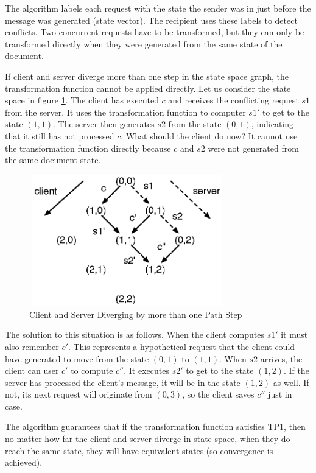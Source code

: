 The algorithm labels each request with the state the sender was in just before the message was generated (state vector). The recipient uses these labels to detect conflicts. Two concurrent requests have to be transformed, but they can only be transformed directly when they were generated from the same state of the document.

If client and server diverge more than one step in the state space graph, the transformation function cannot be applied directly. Let us consider the state space in figure \ref{fig:concepts.statespace2}. The client has executed $c$ and receives the conflicting request $s1$ from the server. It uses the transformation function to computer $s1'$ to get to the state $(1,1)$. The server then generates $s2$ from the state $(0,1)$, indicating that it still has not processed $c$. What should the client do now? It cannot use the transformation function directly because $c$ and $s2$ were not generated from the same document state.

\begin{figure}[htb]
 \centering
 \includegraphics[width=8.5cm,height=5.7cm]{../../images/concepts_statespace2.eps}
 \caption{Client and Server Diverging by more than one Path Step}
 \label{fig:concepts.statespace2}
\end{figure}

The solution to this situation is as follows. When the client computes $s1'$ it must also remember $c'$. This represents a hypothetical request that the client could have generated to move from the state $(0,1)$ to $(1,1)$. When $s2$ arrives, the client can user $c'$ to compute $c''$. It executes $s2'$ to get to the state $(1,2)$. If the server has processed the client's message, it will be in the state $(1,2)$ as well. If not, its next request will originate from $(0,3)$, so the client saves $c''$ just in case.

The algorithm guarantees that if the transformation function satisfies TP1, then no matter how far the client and server diverge in state space, when they do reach the same state, they will have equivalent states (so convergence is achieved).

